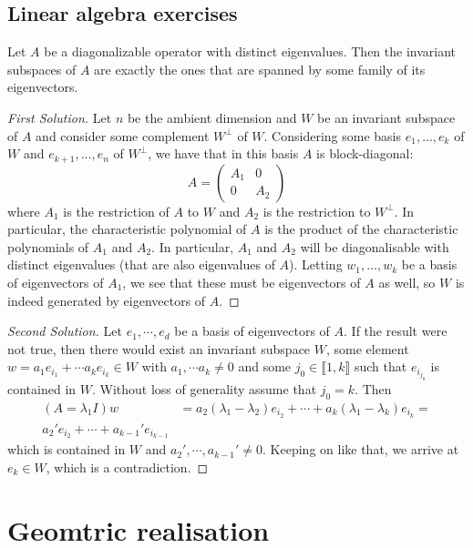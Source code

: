 \documentclass{report}
\begin{document}
\section{Linear algebra exercises}
\begin{exercise}
    Let $A$ be a diagonalizable operator with distinct eigenvalues.
    Then the invariant subspaces of $A$ are exactly the ones that are spanned by some family of its eigenvectors.
\end{exercise}
\begin{proof}[First Solution]
Let $n$ be the ambient dimension and $W$ be an invariant subspace of $A$ and consider some complement $W^{\perp}$ of $W$.
Considering some basis $e_1, \ldots, e_k$ of $W$ and $e_{k+1}, \ldots, e_n$ of $W^{\perp}$, we have that in this basis $A$ is block-diagonal:
\[
A = \begin{pmatrix} A_1 & 0 \\ 0 & A_2 \end{pmatrix}
\]
where $A_1$ is the restriction of $A$ to $W$ and $A_2$ is the restriction to $W^{\perp}$.
In particular, the characteristic polynomial of $A$ is the product of the characteristic polynomials of $A_1$ and $A_2$.
In particular, $A_1$ and $A_2$ will be diagonalisable with distinct eigenvalues (that are also eigenvalues of $A$).
Letting $w_1, \ldots, w_k$ be a basis of eigenvectors of $A_1$, we see that these must be 
eigenvectors of $A$ as well, so $W$ is indeed generated by eigenvectors of $A$.
\end{proof}
\begin{proof}[Second Solution]
    Let $e_1, \cdots, e_d$ be a basis of eigenvectors of $A$.
    If the result were not true, then there would exist an invariant subspace $W$, some element $w = a_1 e_{i_1} + \cdots a_k e_{i_k} \in W$ with $a_1, \cdots a_k \neq 0$ and some $j_0 \in \llbracket 1, k \rrbracket $ such that $e_{i_{j_0}}$ is contained in $W$.
    Without loss of generality assume that $j_0 = k$.
    Then 
    \begin{align*}
        (A = \lambda_1 I)w &= a_2 (\lambda_1 - \lambda_2) e_{i_2} + \cdots + a_k (\lambda_1 - \lambda_k) e_{i_k} = \\
        a_2' e_{i_2} + \cdots + a_{k-1}' e_{i_{k-1}}
    \end{align*}
    which is contained in $W$ and $a_2', \cdots, a_{k-1}' \neq 0$.
    Keeping on like that, we arrive at $e_k \in W$, which is a contradiction.
\end{proof}

\chapter{Geomtric realisation}
\end{document}
